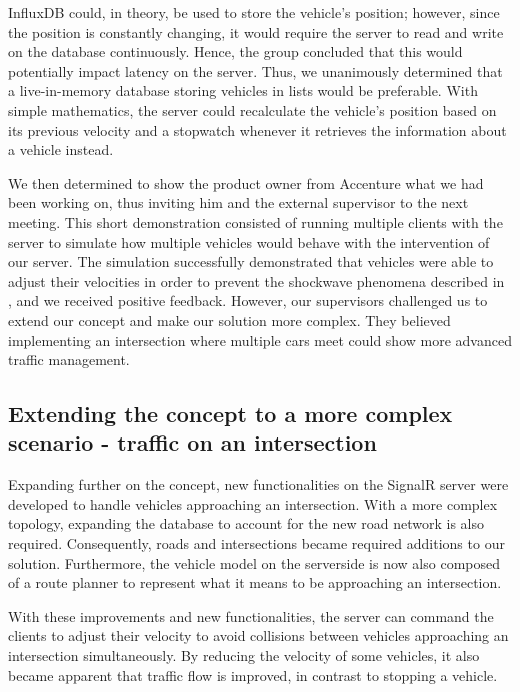 InfluxDB could, in theory, be used to store the vehicle's position; however, since the position is constantly changing, it would require the server to read and write on the database continuously. Hence, the group concluded that this would potentially impact latency on the server. Thus, we unanimously determined that a live-in-memory database storing vehicles in lists would be preferable. With simple mathematics, the server could recalculate the vehicle's position based on its previous velocity and a stopwatch whenever it retrieves the information about a vehicle instead.

We then determined to show the product owner from Accenture what we had been working on, thus inviting him and the external supervisor to the next meeting. This short demonstration consisted of running multiple clients with the server to simulate how multiple vehicles would behave with the intervention of our server. The simulation successfully demonstrated that vehicles were able to adjust their velocities in order to prevent the shockwave phenomena described in , and we received positive feedback. However, our supervisors challenged us to extend our concept and make our solution more complex. They believed implementing an intersection where multiple cars meet could show more advanced traffic management.

\subsection{Extending the concept to a more complex scenario - traffic on an intersection}
Expanding further on the concept, new functionalities on the SignalR server were developed to handle vehicles approaching an intersection. With a more complex topology, expanding the database to account for the new road network is also required. Consequently, roads and intersections became required additions to our solution. Furthermore, the vehicle model on the serverside is now also composed of a route planner to represent what it means to be approaching an intersection.

With these improvements and new functionalities, the server can command the clients to adjust their velocity to avoid collisions between vehicles approaching an intersection simultaneously. By reducing the velocity of some vehicles, it also became apparent that traffic flow is improved, in contrast to stopping a vehicle.
